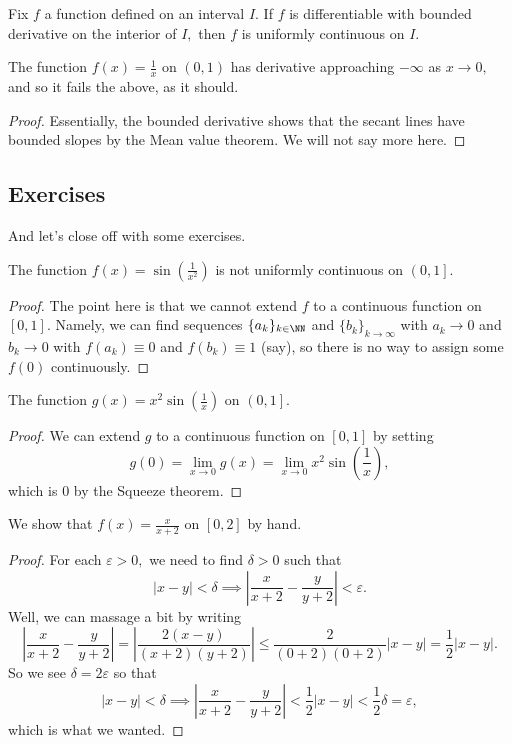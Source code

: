 \begin{proposition}
	Fix $f$ a function defined on an interval $I.$ If $f$ is differentiable with bounded derivative on the interior of $I,$ then $f$ is uniformly continuous on $I.$
\end{proposition}
\begin{nex}
	The function $f(x)=\frac1x$ on $(0,1)$ has derivative approaching $-\infty$ as $x\to0,$ and so it fails the above, as it should.
\end{nex}
\begin{proof}
	Essentially, the bounded derivative shows that the secant lines have bounded slopes by the Mean value theorem. We will not say more here.
\end{proof}

\subsection{Exercises}
And let's close off with some exercises.
\begin{exercise}[Ross 19.1(f)]
	The function $f(x)=\sin\left(\frac1{x^2}\right)$ is not uniformly continuous on $\left(0,1\right].$
\end{exercise}
\begin{proof}
	The point here is that we cannot extend $f$ to a continuous function on $[0,1].$ Namely, we can find sequences $\{a_k\}_{k\in\NN}$ and $\{b_k\}_{k\to\infty}$ with $a_k\to0$ and $b_k\to0$ with $f(a_k)\equiv0$ and $f(b_k)\equiv1$ (say), so there is no way to assign some $f(0)$ continuously.
\end{proof}
\begin{exercise}[Ross 19.1(g)]
	The function $g(x)=x^2\sin\left(\frac1x\right)$ on $\left(0,1\right].$
\end{exercise}
\begin{proof}
	We can extend $g$ to a continuous function on $[0,1]$ by setting
	\[g(0)=\lim_{x\to0}g(x)=\lim_{x\to0}x^2\sin\left(\frac1x\right),\]
	which is $0$ by the Squeeze theorem.
\end{proof}
\begin{exercise}[Ross 19.3(a)]
	We show that $f(x)=\frac x{x+2}$ on $[0,2]$ by hand.
\end{exercise}
\begin{proof}
	For each $\varepsilon>0,$ we need to find $\delta>0$ such that
	\[|x-y|<\delta\implies\left|\frac x{x+2}-\frac y{y+2}\right|<\varepsilon.\]
	Well, we can massage a bit by writing
	\[\left|\frac x{x+2}-\frac y{y+2}\right|=\left|\frac{2(x-y)}{(x+2)(y+2)}\right|\le\frac2{(0+2)(0+2)}|x-y|=\frac12|x-y|.\]
	So we see $\delta=2\varepsilon$ so that
	\[|x-y|<\delta\implies\left|\frac x{x+2}-\frac y{y+2}\right|<\frac12|x-y|<\frac12\delta=\varepsilon,\]
	which is what we wanted.
\end{proof}
